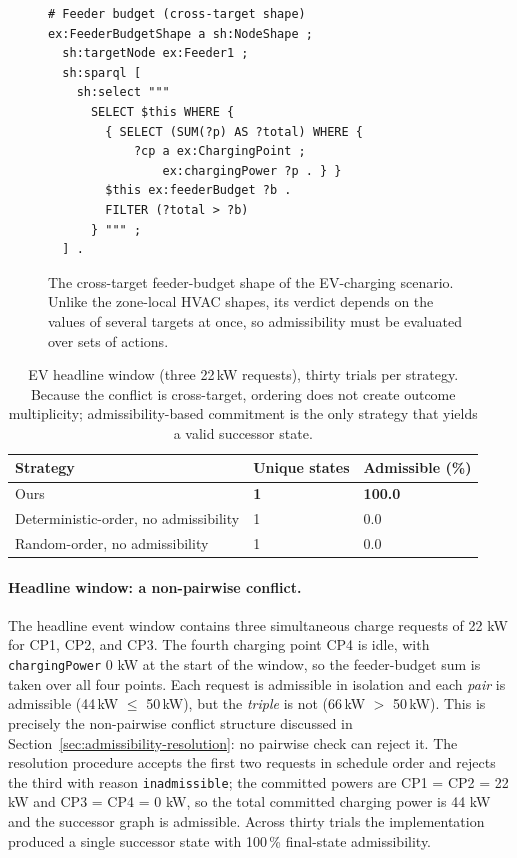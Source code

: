 \documentclass{ieeeaccess}
\theoremstyle{definition}
\theoremstyle{plain}
\theoremstyle{remark}
\begin{document}
\begin{figure}[h]
\small
\begin{verbatim}
# Feeder budget (cross-target shape)
ex:FeederBudgetShape a sh:NodeShape ;
  sh:targetNode ex:Feeder1 ;
  sh:sparql [
    sh:select """
      SELECT $this WHERE {
        { SELECT (SUM(?p) AS ?total) WHERE {
            ?cp a ex:ChargingPoint ;
                ex:chargingPower ?p . } }
        $this ex:feederBudget ?b .
        FILTER (?total > ?b)
      } """ ;
  ] .
\end{verbatim}
\caption{The cross-target feeder-budget shape of the EV-charging scenario. Unlike the zone-local HVAC shapes, its verdict depends on the values of several targets at once, so admissibility must be evaluated over sets of actions.}
\label{fig:ev-shape}
\end{figure}


\begin{table}[t]
\caption{EV headline window (three 22\,kW requests), thirty trials per strategy.
Because the conflict is cross-target, ordering does not create outcome
multiplicity; admissibility-based commitment is the only strategy that yields a
valid successor state.}
\label{tab:ev-baseline}
\centering
\small
\begin{tabular}{|p{3.4cm}|p{1.5cm}|p{2.0cm}|}
\hline
\textbf{Strategy} & \textbf{Unique states} & \textbf{Admissible (\%)} \\
\hline
Ours                                   & \textbf{1} & \textbf{100.0} \\
\hline
Deterministic-order, no admissibility  & 1          & 0.0 \\
\hline
Random-order, no admissibility         & 1          & 0.0 \\
\hline
\end{tabular}
\end{table}
\paragraph{Headline window: a non-pairwise conflict.}
The headline event window contains three simultaneous charge requests of 22 kW for CP1, CP2, and CP3. The fourth charging point CP4 is idle, with \texttt{chargingPower} 0 kW at the start of the window, so the feeder-budget sum is taken over all four points. Each request is admissible in isolation and each \emph{pair} is admissible (44\,kW $\le$ 50\,kW), but the \emph{triple} is not
(66\,kW $>$ 50\,kW). This is precisely the non-pairwise conflict structure
discussed in Section~\ref{sec:admissibility-resolution}: no pairwise check can
reject it. The resolution procedure accepts the first two requests in schedule order and rejects the third with reason \texttt{inadmissible}; the committed powers are CP1 = CP2 = 22 kW and CP3 = CP4 = 0 kW, so the total committed charging power is 44 kW and the successor graph is admissible. Across thirty trials the implementation produced a single
successor state with 100\,\% final-state admissibility.
\end{document}
